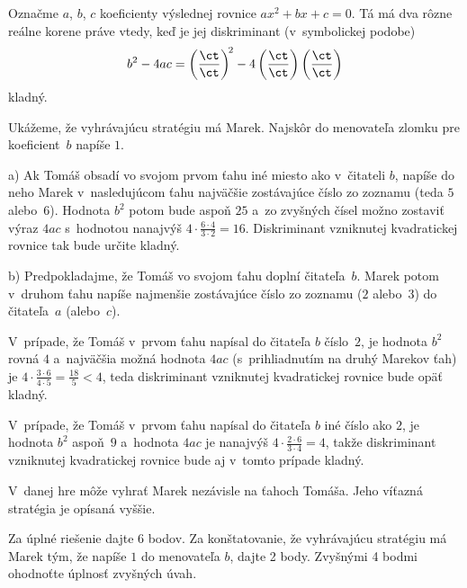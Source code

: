 {%
Označme $a$, $b$, $c$ koeficienty výslednej rovnice $ax^2+bx+c=0$. Tá má dva rôzne reálne
korene práve vtedy, keď je jej diskriminant (v~symbolickej podobe)
$$
b^2-4ac=\left(\frac\ct\ct\right)^{\!2}-4\left(\frac{\ct}{\ct}\right)\left(\frac\ct\ct\right)
$$
kladný.

Ukážeme, že vyhrávajúcu stratégiu má Marek. Najskôr do menovateľa zlomku pre koeficient~$b$
napíše $1$.

\item{a)} Ak Tomáš obsadí vo svojom prvom ťahu iné miesto ako v~čitateli $b$, napíše
do neho Marek v~nasledujúcom ťahu najväčšie zostávajúce číslo zo zoznamu (teda $5$ alebo~$6$).
Hodnota $b^2$ potom bude aspoň $25$ a~zo zvyšných čísel možno zostaviť výraz $4ac$
s~hodnotou nanajvýš $4\cdot\frac{6\cdot4}{3\cdot2}=16$. Diskriminant vzniknutej kvadratickej
rovnice tak bude určite kladný.

\item{b)} Predpokladajme, že Tomáš vo svojom ťahu doplní čitateľa~$b$. Marek potom v~druhom ťahu napíše najmenšie zostávajúce číslo zo zoznamu ($2$ alebo~$3$) do čitateľa~$a$
(alebo~$c$).

 V~prípade, že Tomáš v~prvom ťahu napísal do čitateľa $b$ číslo~$2$, je
hodnota $b^2$ rovná $4$ a~najväčšia možná hodnota $4ac$ (s~prihliadnutím na druhý
Marekov ťah) je $4\cdot\frac{3\cdot6}{4\cdot 5}=\frac{18}{5}<4$, teda diskriminant
vzniknutej kvadratickej rovnice bude opäť kladný.

 V~prípade, že Tomáš v~prvom ťahu napísal do čitateľa $b$ iné číslo
ako $2$, je hodnota $b^2$ aspoň~$9$ a~hodnota $4ac$ je nanajvýš
$4\cdot\frac{2\cdot6}{3\cdot4}=4$, takže diskriminant vzniknutej kvadratickej rovnice bude
aj v~tomto prípade kladný.

\zaver
V~danej hre môže vyhrať Marek nezávisle na ťahoch Tomáša. Jeho víťazná stratégia je
opísaná vyššie.


\nobreak\medskip\petit\noindent
Za úplné riešenie dajte 6 bodov.
Za konštatovanie, že vyhrávajúcu stratégiu má
Marek tým, že napíše $1$ do menovateľa $b$, dajte 2 body. Zvyšnými 4 bodmi ohodnoťte
úplnosť zvyšných úvah.
\endpetit
\bigbreak
}

